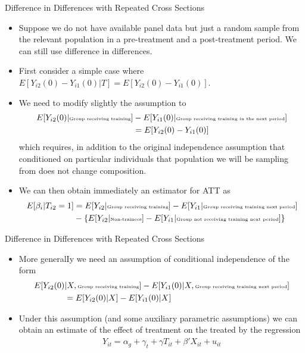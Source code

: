 \begin{frame}{Difference in Differences with Repeated Cross Sections}
\small
\begin{itemize}
\item Suppose we do not have available panel data but just a random sample from the relevant population in a pre-treatment and a post-treatment period. We can still use difference in differences.
\item First consider a simple case where {\small $E[Y_{i2}(0)- Y_{i1}(0) | T] = E[Y_{i2}(0)- Y_{i1}(0)]$}.
\item We need to modify slightly the assumption to
\vspace{-.5pc}
\begin{align*}
E[Y_{i2}(0) | \text{\tiny Group receiving training}]&-E[Y_{i1}(0) | \text{\tiny Group receiving training in the next period}] \\
&= E[Y_{i2}(0)-Y_{i1}(0)]  
\end{align*}
which requires, in addition to the original independence
assumption that conditioned on particular individuals that population we will be sampling from does not change composition.
\item We can then obtain immediately an estimator for ATT as
\begin{align*}
E[\beta_i |T_{i2}=1] 
&= E[Y_{i2}| \text{\tiny Group receiving training}]-E[Y_{i1}| \text{\tiny Group receiving training next period}] \\
&- \{E[Y_{i2} | \text{\tiny Non-trainees}] - E[Y_{i1} | \text{\tiny Group not receiving training next period}]\}
\end{align*}
\end{itemize}
\end{frame}


\begin{frame}{Difference in Differences with Repeated Cross Sections}
\begin{itemize}
\item More generalIy we need an assumption of conditional independence of the form
\begin{align*}
E[Y_{i2}(0) & | X, \text{\tiny Group receiving training}]-E[Y_{i1}(0) | X, \text{\tiny Group receiving training next period}] \\
&= E[Y_{i2}(0) | X] - E[Y_{i1}(0) |X]
\end{align*}
\item Under this assumption (and some auxiliary parametric assumptions) we can obtain an estimate of the effect of treatment on the treated by the regression
\begin{align*}
Y_{it} = \alpha_g + \gamma_t + \gamma T_{it} + \beta' X_{it} + u_{it}
\end{align*} 
\end{itemize}
\end{frame}

